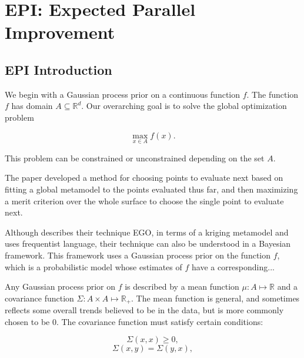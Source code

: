 \documentclass[phd,tocprelim]{cornell}
\begin{document}


\part{EPI: Expected Parallel Improvement} %
\label{prt:EPI: Expected Parallel Improvement}

\chapter{EPI Introduction} %
\label{cha:EPI Introduction}

We begin with a Gaussian process prior on a continuous function $f$. The function $f$ has domain $A \subseteq \mathbb{R}^{d}$. Our overarching goal is to solve the global optimization problem

\begin{equation}
\max_{x \in A} f(x).
\end{equation}

This problem can be constrained or unconstrained depending on the set $A$.

The paper \cite{JoScWe98} developed a method for choosing points to evaluate next based on fitting a global metamodel to the points evaluated thus far, and then maximizing a merit criterion over the whole surface to choose the single point to evaluate next.

Although \cite{JoScWe98} describes their technique EGO, in terms of a kriging metamodel and uses frequentist language, their technique can also be understood in a Bayesian framework. This framework uses a Gaussian process prior on the function $f$, which is a probabilistic model whose estimates of $f$ have a corresponding...

Any Gaussian process prior on $f$ is described by a mean function $\mu : A \mapsto \mathbb{R}$ and a covariance function $\Sigma : A \times A \mapsto \mathbb{R}_{+}$. The mean function is general, and sometimes reflects some overall trends believed to be in the data, but is more commonly chosen to be 0. The covariance function must satisfy certain conditions: 

\begin{equation}\Sigma(x,x) \geq 0,\end{equation}
\begin{equation}\Sigma(x,y) = \Sigma(y,x),\end{equation}
\end{document}
